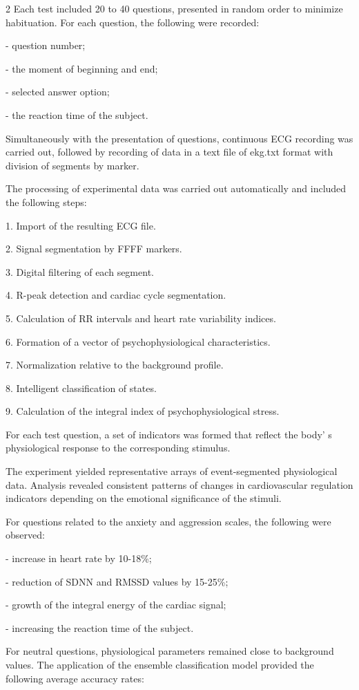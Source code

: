\begin{multicols}{2}
Each test included 20 to 40 questions, presented in random order to
minimize habituation. For each question, the following were recorded:

- question number;

- the moment of beginning and end;

- selected answer option;

- the reaction time of the subject.

Simultaneously with the presentation of questions, continuous ECG
recording was carried out, followed by recording of data in a text file
of ekg.txt format with division of segments by marker.

The processing of experimental data was carried out automatically and
included the following steps:

1. Import of the resulting ECG file.

2. Signal segmentation by FFFF markers.

3. Digital filtering of each segment.

4. R-peak detection and cardiac cycle segmentation.

5. Calculation of RR intervals and heart rate variability indices.

6. Formation of a vector of psychophysiological characteristics.

7. Normalization relative to the background profile.

8. Intelligent classification of states.

9. Calculation of the integral index of psychophysiological stress.

For each test question, a set of indicators was formed that reflect the
body' s physiological response to the corresponding
stimulus.

The experiment yielded representative arrays of event-segmented
physiological data. Analysis revealed consistent patterns of changes in
cardiovascular regulation indicators depending on the emotional
significance of the stimuli.

For questions related to the anxiety and aggression scales, the
following were observed:

- increase in heart rate by 10-18\%;

- reduction of SDNN and RMSSD values by 15-25\%;

- growth of the integral energy of the cardiac signal;

- increasing the reaction time of the subject.

For neutral questions, physiological parameters remained close to
background values. The application of the ensemble classification model
provided the following average accuracy rates:


\end{multicols}
